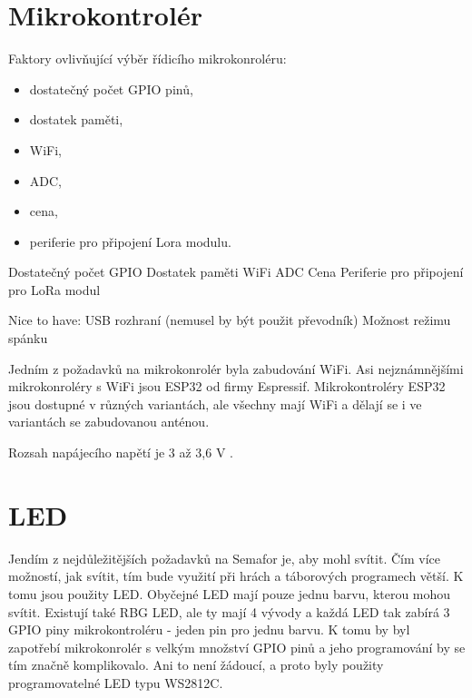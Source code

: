 
\section{Mikrokontrolér}
Faktory ovlivňující výběr řídicího mikrokonroléru:
\begin{itemize}
  \item dostatečný počet GPIO pinů,
  \item dostatek paměti,
  \item WiFi,
  \item ADC,
  \item cena,
  \item periferie pro připojení Lora modulu.
\end{itemize}

Dostatečný počet GPIO %
Dostatek paměti %
WiFi
ADC %
Cena %
Periferie pro připojení pro LoRa modul

Nice to have:
USB rozhraní (nemusel by být použit převodník)
Možnost režimu spánku %


Jedním z požadavků na mikrokonrolér byla zabudování WiFi. Asi nejznámnějšími mikrokonroléry s WiFi jsou ESP32 od firmy 
Espressif. Mikrokontroléry ESP32 jsou dostupné v různých variantách, ale všechny mají WiFi a dělají se i ve variantách 
se zabudovanou anténou. 

Rozsah napájecího napětí je 3 až 3,6 V \cite{ESP_C3_dtsh}.

\section{LED}
Jendím z nejdůležitějších požadavků na Semafor je, aby mohl svítit. Čím více možností, jak svítit, tím bude využití 
při hrách a táborových programech větší. K tomu jsou použity LED. Obyčejné LED mají pouze jednu barvu, kterou 
mohou svítit. Existují také RBG LED, ale ty mají 4 vývody a každá LED tak zabírá 3 GPIO piny mikrokontroléru - jeden pin
pro jednu barvu. K tomu by byl zapotřebí mikrokonrolér s velkým množství GPIO pinů a jeho programování by se tím značně 
komplikovalo. Ani to není žádoucí, a proto byly použity programovatelné LED typu WS2812C.


